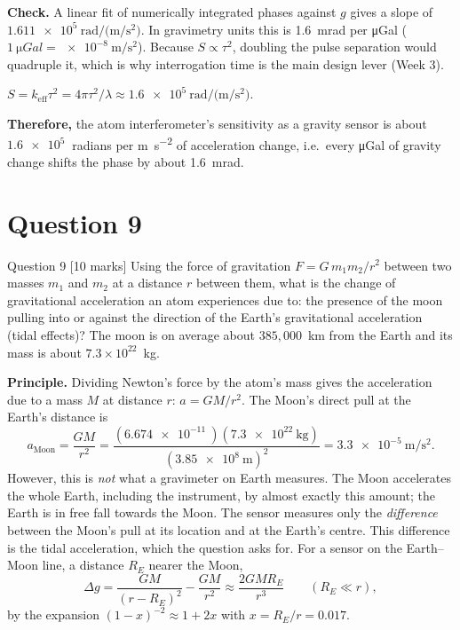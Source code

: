 \documentclass[11pt]{article}
\newcommand{\closing}[1]{\par\medskip\noindent\textbf{Therefore,} #1}
\begin{document}
\textbf{Check.} A linear fit of numerically integrated phases against $g$ gives a slope of
$\SI{1.611e5}{\radian\per(\metre\per\second\squared)}$. In gravimetry units this is
\SI{1.6}{\milli\radian} per \si{\micro Gal} ($\SI{1}{\micro Gal} = \SI{e-8}{\metre\per\second\squared}$).
Because $S\propto\tau^2$, doubling the pulse separation would quadruple it, which is why
interrogation time is the main design lever (Week 3).

\begin{answerbox}
$S = k_{\mathrm{eff}}\tau^2 = 4\pi\tau^2/\lambda \approx \SI{1.6e5}{\radian\per(\metre\per\second\squared)}$.
\closing{the atom interferometer's sensitivity as a gravity sensor is about
$\SI{1.6e5}{}$ radians per \si{\metre\per\second\squared} of acceleration change, i.e.\ every
\si{\micro Gal} of gravity change shifts the phase by about \SI{1.6}{\milli\radian}.}
\end{answerbox}

\section{Question 9}

\begin{problembox}{Question 9 \hfill [10 marks]}
Using the force of gravitation $F=G\,m_1 m_2/r^2$ between two masses $m_1$ and $m_2$ at a distance
$r$ between them, what is the change of gravitational acceleration an atom experiences due to:
the presence of the moon pulling into or against the direction of the Earth's gravitational
acceleration (tidal effects)? The moon is on average about $385{,}000$~km from the Earth and its mass
is about $7.3\times 10^{22}$~kg.
\end{problembox}

\textbf{Principle.} Dividing Newton's force by the atom's mass gives the acceleration due to a mass
$M$ at distance $r$: $a = GM/r^2$. The Moon's direct pull at the Earth's distance is
\[
a_{\mathrm{Moon}} = \frac{GM}{r^2} = \frac{(\SI{6.674e-11}{})(\SI{7.3e22}{\kilogram})}{(\SI{3.85e8}{\metre})^2}
= \SI{3.3e-5}{\metre\per\second\squared}.
\]
However, this is \emph{not} what a gravimeter on Earth measures. The Moon accelerates the whole Earth,
including the instrument, by almost exactly this amount; the Earth is in free fall towards the Moon.
The sensor measures only the \emph{difference} between the Moon's pull at its location and at the
Earth's centre. This difference is the tidal acceleration, which the question asks for. For a sensor
on the Earth--Moon line, a distance $R_E$ nearer the Moon,
\[
\Delta g = \frac{GM}{(r-R_E)^2}-\frac{GM}{r^2} \approx \frac{2GMR_E}{r^3}\qquad(R_E\ll r),
\]
by the expansion $(1-x)^{-2}\approx 1+2x$ with $x = R_E/r = 0.017$.
\end{document}
